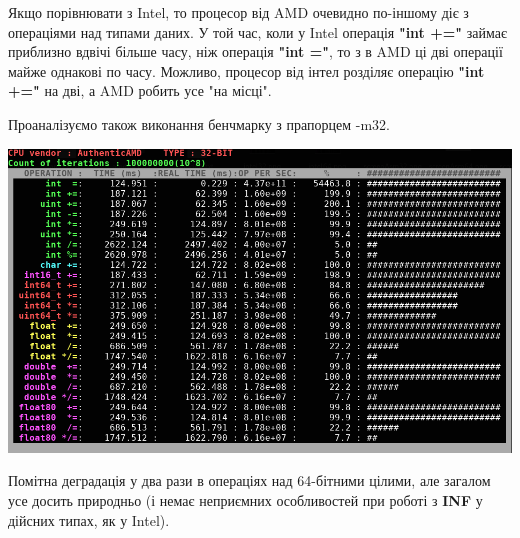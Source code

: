 Якщо порівнювати з Intel, то процесор від AMD очевидно по-іншому діє з операціями над типами даних. У той час, коли у Intel операція \textbf{"int +="} займає приблизно вдвічі більше часу, ніж операція \textbf{"int ="}, то з в AMD ці дві операції майже однакові по часу. Можливо, процесор від інтел розділяє операцію  \textbf{"int +="} на дві, а AMD робить усе "на місці". 

Проаналізуємо також виконання бенчмарку з прапорцем -m32.

\includegraphics[width = 16cm]{img/amd32.png}
 
Помітна деградація у два рази в операціях над 64-бітними цілими, але загалом усе досить природньо (і немає неприємних особливостей при роботі з \textbf{INF} у дійсних типах, як у Intel).


